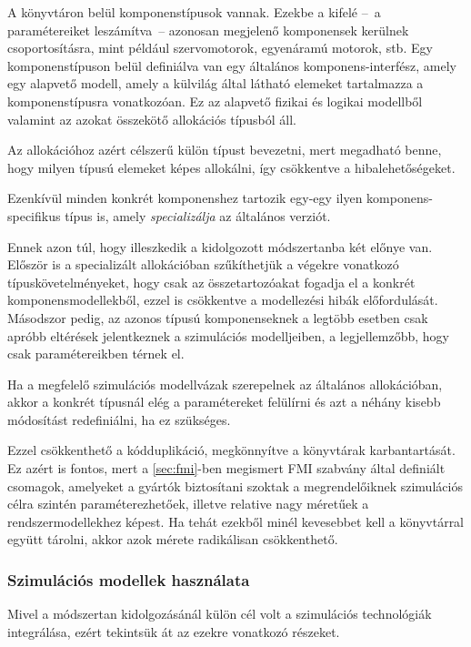         A könyvtáron belül komponenstípusok vannak. Ezekbe a kifelé --~a paramétereiket leszámítva~-- azonosan megjelenő komponensek kerülnek csoportosításra, mint például szervomotorok, egyenáramú motorok, stb.
        Egy komponenstípuson belül definiálva van egy általános komponens-interfész, amely egy alapvető modell, amely a külvilág által látható elemeket tartalmazza a komponenstípusra vonatkozóan. Ez az alapvető fizikai és logikai modellből valamint az azokat összekötő allokációs típusból áll.
        
        Az allokációhoz azért célszerű külön típust bevezetni, mert megadható benne, hogy milyen típusú elemeket képes allokálni, így csökkentve a hibalehetőségeket.
        
        Ezenkívül minden konkrét komponenshez tartozik egy-egy ilyen komponens-specifikus típus is, amely \emph{specializálja} az általános verziót.
        
        Ennek azon túl, hogy illeszkedik a kidolgozott módszertanba két előnye van.
        Először is a specializált allokációban szűkíthetjük a végekre vonatkozó típuskövetelményeket, hogy csak az összetartozóakat fogadja el a konkrét komponensmodellekből, ezzel is csökkentve a modellezési hibák előfordulását.
        Másodszor pedig, az azonos típusú komponenseknek a legtöbb esetben csak apróbb eltérések jelentkeznek a szimulációs modelljeiben, a legjellemzőbb, hogy csak paramétereikben térnek el.
        
        Ha a megfelelő szimulációs modellvázak szerepelnek az általános allokációban, akkor a konkrét típusnál elég a paramétereket felülírni és azt a néhány kisebb módosítást redefiniálni, ha ez szükséges.
        
        Ezzel csökkenthető a kódduplikáció, megkönnyítve a könyvtárak karbantartását. Ez azért is fontos, mert a \ref{sec:fmi}-ben megismert FMI szabvány által definiált csomagok, amelyeket a gyártók biztosítani szoktak a megrendelőiknek szimulációs célra szintén paraméterezhetőek, illetve relative nagy méretűek a rendszermodellekhez képest.
        Ha tehát ezekből minél kevesebbet kell a könyvtárral együtt tárolni, akkor azok mérete radikálisan csökkenthető.

        \subsubsection{Szimulációs modellek használata}
        Mivel a módszertan kidolgozásánál külön cél volt a szimulációs technológiák integrálása, ezért tekintsük át az ezekre vonatkozó részeket.
        
